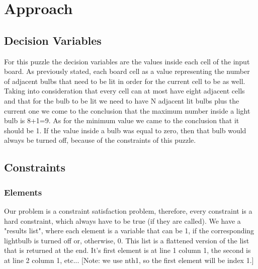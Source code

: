 \documentclass[runningheads]{llncs}
\begin{document}
\section{Approach}

\subsection{Decision Variables}
For this puzzle the decision variables are the values inside each cell of the input board. As previously stated, each board cell as a value representing the number of adjacent bulbs that need to be lit in order for the current cell to be as well.
Taking into consideration that every cell can at most have eight adjacent cells and that for the bulb to be lit we need to have N adjacent lit bulbs plus the current one we come to the conclusion that the maximum number inside a light bulb is 8+1=9. As for the minimum value we came to the conclusion that it should be 1. If the value inside a bulb was equal to zero, then that bulb would always be turned off, because of the constraints of this puzzle.

\subsection{Constraints}
\subsubsection{Elements} \hfill \break
Our problem is a constraint satisfaction problem, therefore, every constraint is a hard constraint, which always have to be true (if they are called).
We have a "results list", where each element is a variable that can be 1, if the corresponding lightbulb is turned off or, otherwise, 0. This list is a flattened version of the list that is returned at the end. It's first element is at line 1 column 1, the second is at line 2 column 1, etc...
[Note: we use nth1, so the first element will be index 1.]
\end{document}
